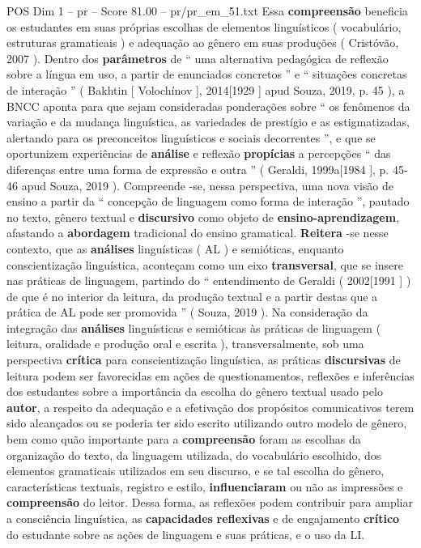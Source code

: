 \begin{textsample}{POS Dim 1 – pr – Score 81.00 – pr/pr\_em\_51.txt}
Essa \textbf{compreensão} beneficia os estudantes em suas próprias escolhas de elementos linguísticos ( vocabulário, estruturas gramaticais ) e adequação ao gênero em suas produções ( Cristóvão, 2007 ).
Dentro dos \textbf{parâmetros} de “ uma alternativa pedagógica de reflexão sobre a língua em uso, a partir de enunciados concretos ” e “ situações concretas de interação ” ( Bakhtin [ Volochínov ], 2014[1929 ] apud Souza, 2019, p. 45 ), a BNCC aponta para que sejam consideradas ponderações sobre “ os fenômenos da variação e da mudança linguística, as variedades de prestígio e as estigmatizadas, alertando para os preconceitos linguísticos e sociais decorrentes ”, e que se oportunizem experiências de \textbf{análise} e reflexão \textbf{propícias} a percepções “ das diferenças entre uma forma de expressão e outra ” ( Geraldi, 1999a[1984 ], p. 45-46 apud Souza, 2019 ).
Compreende -se, nessa perspectiva, uma nova visão de ensino a partir da “ concepção de linguagem como forma de interação ”, pautado no texto, gênero textual e \textbf{discursivo} como objeto de \textbf{ensino-aprendizagem}, afastando a \textbf{abordagem} tradicional do ensino gramatical. \textbf{Reitera} -se nesse contexto, que as \textbf{análises} linguísticas ( AL ) e semióticas, enquanto conscientização linguística, aconteçam como um eixo \textbf{transversal}, que se insere nas práticas de linguagem, partindo do “ entendimento de Geraldi ( 2002[1991 ] ) de que é no interior da leitura, da produção textual e a partir destas que a prática de AL pode ser promovida ” ( Souza, 2019 ).
Na consideração da integração das \textbf{análises} linguísticas e semióticas às práticas de linguagem ( leitura, oralidade e produção oral e escrita ), transversalmente, sob uma perspectiva \textbf{crítica} para conscientização linguística, as práticas \textbf{discursivas} de leitura podem ser favorecidas em ações de questionamentos, reflexões e inferências dos estudantes sobre a importância da escolha do gênero textual usado pelo \textbf{autor}, a respeito da adequação e a efetivação dos propósitos comunicativos terem sido alcançados ou se poderia ter sido escrito utilizando outro modelo de gênero, bem como quão importante para a \textbf{compreensão} foram as escolhas da organização do texto, da linguagem utilizada, do vocabulário escolhido, dos elementos gramaticais utilizados em seu discurso, e se tal escolha do gênero, características textuais, registro e estilo, \textbf{influenciaram} ou não as impressões e \textbf{compreensão} do leitor.
Dessa forma, as reflexões podem contribuir para ampliar a consciência linguística, as \textbf{capacidades} \textbf{reflexivas} e de engajamento \textbf{crítico} do estudante sobre as ações de linguagem e suas práticas, e o uso da LI.

\end{textsample}
